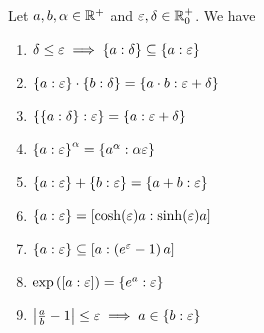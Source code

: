 \begin{theorem} \label{thm:multiplicative:rules}
  Let $a,b,\alpha\in \Rplus$ and $\epsilon,\delta \in\Rplusnull$. We have

  \begin{enumerate}
    \item $\delta \le \epsilon \implies \ean[\delta]{a} \subseteq \ean[\epsilon]{a}$ 
    \item $\ean[\epsilon]{a} \cdot \ean[\delta]{b} = \ean[\epsilon+\delta]{a\cdot b}$
    \item $\ean[\epsilon]{\ean[\delta]{a}} = \ean[\epsilon+\delta]{a}$
    \item $\ean[\epsilon]{a}^\alpha = \ean[\alpha\epsilon]{a^\alpha}$
    \item $\ean[\epsilon]{a} + \ean[\epsilon]{b} = \ean[\epsilon]{a+b}$
    \item $\ean[\epsilon]{a} = \an[\sinh(\epsilon)a]{\cosh(\epsilon)a}$
    \item $\ean[\epsilon]{a} \subseteq \an[\left(e^\epsilon-1\right)a]{a}$
    \item $\exp\left(\an[\epsilon]{a}\right) = \ean[\epsilon]{e^a}$
    \item $\abs{\frac ab-1} \le \epsilon \implies a\in\ean[\epsilon]{b}$
  \end{enumerate}
\end{theorem}
